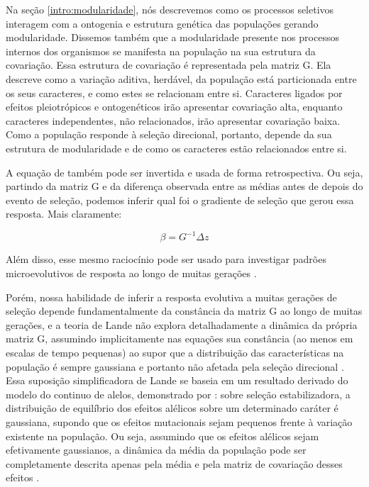 Na seção \ref{intro:modularidade}, nós descrevemos como os processos
seletivos interagem com a ontogenia e estrutura genética das populações
gerando modularidade.
Dissemos também que a modularidade presente nos processos internos dos
organismos se manifesta na população na sua estrutura da covariação.
Essa estrutura de covariação é representada pela matriz G.
Ela descreve como a variação aditiva, herdável, da população está particionada entre os
seus caracteres, e como estes se relacionam entre si.
Caracteres ligados por efeitos pleiotrópicos e ontogenéticos irão
apresentar covariação alta, enquanto caracteres independentes, não
relacionados, irão apresentar covariação baixa.
Como a população responde à seleção direcional, portanto, depende da sua estrutura
de modularidade e de como os caracteres estão relacionados entre si.

A equação de \cite{Lande1979} também pode ser invertida e usada de forma
retrospectiva.
Ou seja, partindo da matriz G e da diferença observada entre as médias
antes de depois do evento de seleção, podemos inferir qual foi o
gradiente de seleção que gerou essa resposta.
Mais claramente:

\begin{equation}
    \beta = G^{-1}\Delta z
\end{equation}

Além disso, esse mesmo raciocínio pode ser usado para investigar padrões
microevolutivos de resposta ao longo de muitas gerações
\citep[veja também a equação \ref{betatotal}]{Lande1983, Marroig2004, Marroig2005}. 

Porém, nossa habilidade de inferir a resposta evolutiva a muitas
gerações de seleção depende fundamentalmente da constância da matriz G
ao longo de muitas gerações, e a teoria de Lande não explora
detalhadamente a dinâmica da própria matriz G, assumindo implicitamente
nas equações sua constância (ao menos em escalas de tempo pequenas) ao
supor que a distribuição das características na população é sempre
gaussiana e portanto não afetada pela seleção direcional
\citep{Barton1987}. 
Essa suposição simplificadora de Lande se baseia em um resultado
derivado do modelo do continuo de alelos, demonstrado por
\cite{Kimura1965}: sobre seleção estabilizadora, a
distribuição de equilíbrio dos efeitos alélicos sobre um determinado
caráter é gaussiana, supondo que os efeitos mutacionais sejam pequenos
frente à variação existente na população. 
Ou seja, assumindo que os efeitos alélicos sejam efetivamente
gaussianos, a dinâmica da média da população pode ser completamente
descrita apenas pela média e pela matriz de covariação desses efeitos
\citep{Barton1987}. 

